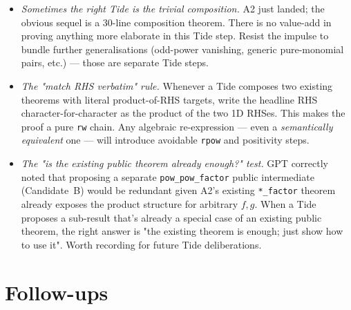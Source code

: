 \documentclass[11pt]{article}
\begin{document}
\begin{itemize}[leftmargin=1em,itemsep=0.2em]
\item \emph{Sometimes the right Tide is the trivial composition.}
  A2 just landed; the obvious sequel is a 30-line composition
  theorem. There is no value-add in proving anything more elaborate
  in this Tide step. Resist the impulse to bundle further
  generalisations (odd-power vanishing, generic pure-monomial pairs,
  etc.) — those are separate Tide steps.

\item \emph{The "match RHS verbatim" rule.} Whenever a Tide composes
  two existing theorems with literal product-of-RHS targets, write
  the headline RHS character-for-character as the product of the
  two 1D RHSes. This makes the proof a pure \texttt{rw} chain. Any
  algebraic re-expression — even a \emph{semantically equivalent}
  one — will introduce avoidable \texttt{rpow} and positivity steps.

\item \emph{The "is the existing public theorem already enough?"
  test.} GPT correctly noted that proposing a separate
  \texttt{pow\_pow\_factor} public intermediate (Candidate~B) would
  be redundant given A2's existing \texttt{*\_factor} theorem
  already exposes the product structure for arbitrary $f, g$. When a
  Tide proposes a sub-result that's already a special case of an
  existing public theorem, the right answer is "the existing theorem
  is enough; just show how to use it". Worth recording for future
  Tide deliberations.
\end{itemize}

\section{Follow-ups}
\end{document}
